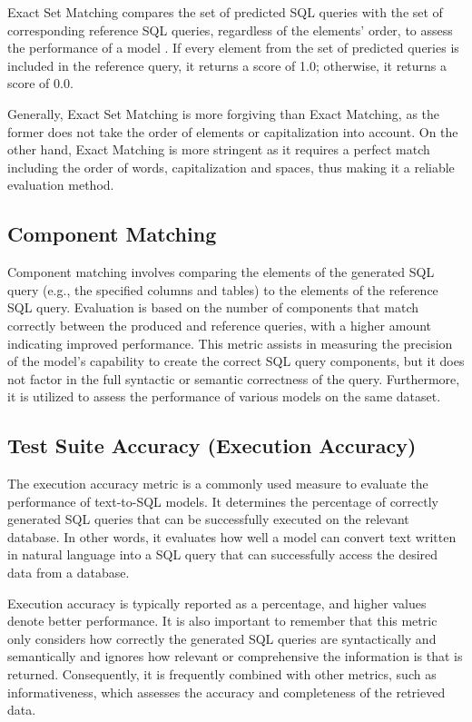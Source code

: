 Exact Set Matching compares the set of predicted SQL queries with the set of corresponding reference SQL queries, regardless of the elements' order, to assess the performance of a model \cite{yu_spider_2019}. If every element from the set of predicted queries is included in the reference query, it returns a score of 1.0; otherwise, it returns a score of 0.0.

Generally, Exact Set Matching is more forgiving than Exact Matching, as the former does not take the order of elements or capitalization into account. On the other hand, Exact Matching is more stringent as it requires a perfect match including the order of words, capitalization and spaces, thus making it a reliable evaluation method.


\subsection{Component Matching}

Component matching\cite{yu_spider_2019} involves comparing the elements of the generated SQL query (e.g., the specified columns and tables) to the elements of the reference SQL query. Evaluation is based on the number of components that match correctly between the produced and reference queries, with a higher amount indicating improved performance. This metric assists in measuring the precision of the model's capability to create the correct SQL query components, but it does not factor in the full syntactic or semantic correctness of the query. Furthermore, it is utilized to assess the performance of various models on the same dataset.

\subsection{Test Suite Accuracy (Execution Accuracy)}

The execution accuracy metric\cite{yu_spider_2019} is a commonly used measure to evaluate the performance of text-to-SQL models. It determines the percentage of correctly generated SQL queries that can be successfully executed on the relevant database. In other words, it evaluates how well a model can convert text written in natural language into a SQL query that can successfully access the desired data from a database.

Execution accuracy is typically reported as a percentage, and higher values denote better performance. It is also important to remember that this metric only considers how correctly the generated SQL queries are syntactically and semantically and ignores how relevant or comprehensive the information is that is returned. Consequently, it is frequently combined with other metrics, such as informativeness, which assesses the accuracy and completeness of the retrieved data.
